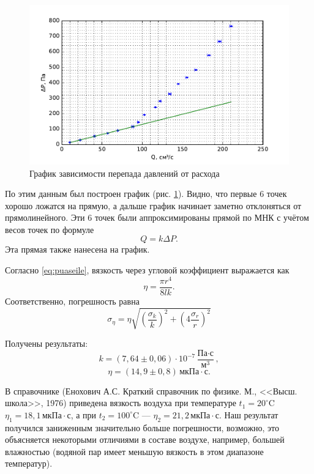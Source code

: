 \documentclass[12pt]{article}
\begin{document}
	\begin{figure}[!h]
	\caption{График зависимости перепада давлений от расхода}
	\label{fig:graph_p_q}
	\begin{center}
	\includegraphics[scale=1]{graph_p_q.pdf}
	\end{center}
	\end{figure}
	
	По этим данным был построен график (рис. \ref{fig:graph_p_q}). Видно, что первые 6 точек хорошо ложатся на прямую, а дальше график начинает заметно отклоняться от прямолинейного. Эти 6 точек были аппроксимированы прямой по МНК с учётом весов точек по формуле $$ Q = k \Delta P. $$
	Эта прямая также нанесена на график.
	
	Согласно \eqref{eq:puaseile}, вязкость через угловой коэффициент выражается как
	\begin{equation}
		\label{eq:visc_from_k}
		\eta = \frac{\pi r^4}{8l k}.
	\end{equation}
	Соответственно, погрешность равна $$ \sigma_\eta = \eta \sqrt{\left( \frac{\sigma_k}{k} \right)^2 + \left( 4 \frac{\sigma_r}{r} \right)^2} $$
	
	Получены результаты: $$ k = \left( 7{,}64\pm 0{,}06 \right) \cdot 10^{-7} \frac{\text{Па} \cdot \text{с}}{\text{м}^3}, $$
	$$ \eta = \left( 14{,}9\pm 0{,}8 \right) \,\text{мкПа} \cdot \text{с}. $$
	
	В справочнике (Енохович А.С. Краткий справочник по физике. М., <<Высш. школа>>, 1976) приведена вязкость воздуха при температуре $t_1=20^\circ \text{C}$ $\eta_1 = 18{,}1 \,\text{мкПа} \cdot \text{с}$, а при $t_2=100^\circ \text{C}$ --- $\eta_2 = 21{,}2 \,\text{мкПа} \cdot \text{с}$. Наш результат получился заниженным значительно больше погрешности, возможно, это объясняется некоторыми отличиями в составе воздухе, например, большей влажностью (водяной пар имеет меньшую вязкость в этом диапазоне температур).
	
\end{document}
